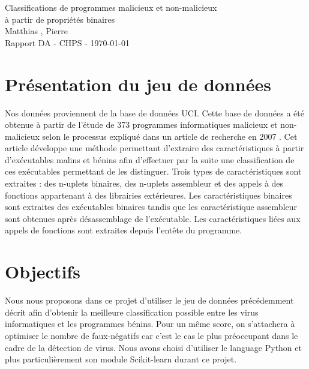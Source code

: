 \documentclass[11pt,a4paper]{article}
\begin{document}
\begin{center}

	{\LARGE\centering Classifications de programmes malicieux et non-malicieux\\ à partir de propriétés binaires}\\[1cm]

	{ Matthias , Pierre }\\[0.5cm]
	{Rapport DA - CHPS - \today}
\end{center}

\tableofcontents

\section{Présentation du jeu de données}
	Nos données proviennent de la base de données UCI\cite{UCI}.
	Cette base de données a été obtenue à partir de l'étude de 373 programmes informatiques malicieux et non-malicieux selon le processus expliqué dans un article de recherche en 2007 \cite{article}. Cet article développe une méthode permettant d'extraire des caractéristiques à partir d'exécutables malins et bénins afin d'effectuer par la suite une classification de ces exécutables permettant de les distinguer. Trois types de caractéristiques sont extraites : des n-uplets binaires, des n-uplets assembleur et des appels à des fonctions appartenant à des librairies extérieures. Les caractéristiques binaires sont extraites des exécutables binaires tandis que les caractéristique assembleur sont obtenues après désassemblage de l'exécutable. Les caractéristiques liées aux appels de fonctions sont extraites depuis l'entête du programme.

\section{Objectifs}
	Nous nous proposons dans ce projet d'utiliser le jeu de données précédemment décrit afin d'obtenir la meilleure classification possible entre les virus informatiques et les programmes bénins. Pour un même score, on s'attachera à optimiser le nombre de faux-négatifs car c'est le cas le plus préoccupant dans le cadre de la détection de virus. Nous avons choisi d'utiliser le language Python et plus particulièrement son module Scikit-learn \cite{sklearn} durant ce projet.
\end{document}
